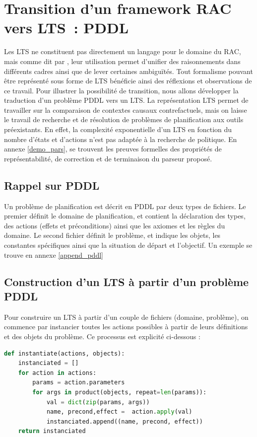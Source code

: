 \section{Transition d'un framework RAC vers LTS : PDDL}\label{parser_section}

Les LTS ne constituent pas directement un langage pour le domaine du RAC, mais comme dit par \textcite{sarmiento_formalising_2025}, leur utilisation permet d'unifier des raisonnements dans différents cadres ainsi que de lever certaines ambiguïtés. Tout formalisme pouvant être représenté sous forme de LTS bénéficie ainsi des réflexions et observations de ce travail. Pour illustrer la possibilité de transition, nous allons développer  la traduction d'un problème PDDL vers un LTS. La représentation LTS permet de travailler sur la comparaison de contextes causaux contrefactuels, mais on laisse le travail de recherche et de résolution de problèmes de planification aux outils préexistants. En effet, la complexité exponentielle d'un LTS en fonction du nombre d'états et d'actions n'est pas adaptée à la recherche de politique. En annexe \ref{demo_pars}, se trouvent les preuves formelles des propriétés de représentabilité, de correction et de terminaison du parseur proposé.


\subsection{Rappel sur PDDL}

Un problème de planification est décrit en PDDL par deux types de fichiers. Le premier définit le domaine de planification, et contient la déclaration des types, des actions (effets et préconditions) ainsi que les axiomes et les règles du domaine. Le second fichier définit le problème, et indique les objets, les constantes spécifiques ainsi que la situation de départ et l'objectif. Un exemple se trouve en annexe \ref{append_pddl}


\subsection{Construction d'un LTS à partir d'un problème PDDL}
Pour construire un LTS à partir d'un couple de fichiers (domaine, problème), on commence par instancier toutes les actions possibles à partir de leurs définitions et des objets du problème. Ce processus est explicité  ci-dessous :

\hfill
\begin{lstlisting}[language=Python,basicstyle=\ttfamily\footnotesize,
                   commentstyle=\color{gray}\itshape,
                   keywordstyle=\bfseries]
def instantiate(actions, objects):
    instanciated = []
    for action in actions:
        params = action.parameters
        for args in product(objects, repeat=len(params)):
            val = dict(zip(params, args))
            name, precond,effect =  action.apply(val)  
            instanciated.append((name, precond, effect))
    return instanciated
\end{lstlisting}
\hfill

